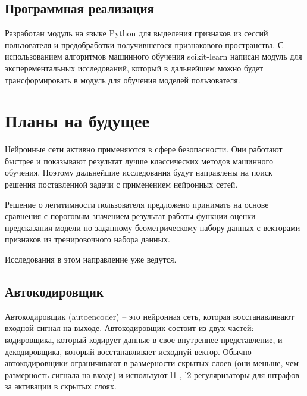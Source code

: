\documentclass[12pt]{article}
\begin{document}
    \subsection{Программная реализация}
    \label{sec:PracticalPart:SoftwareImplementation}

    Разработан модуль на языке Python для выделения признаков из сессий пользователя и предобработки получившегося признакового пространства. С использованием алгоритмов машинного обучения scikit-learn написан модуль для эксперементальных исследований, который в дальнейшем можно будет трансформировать в модуль для обучения моделей пользователя.


    \newpage



    \section{Планы на будущее}
    \label{sec:Future}

    \par Нейронные сети активно применяются в сфере безопасности. Они работают быстрее и показывают результат лучше классических методов машинного обучения. Поэтому дальнейшие исследования будут направлены на поиск решения поставленной задачи с применением нейронных сетей.

    \par Решение о легитимности пользователя предложено принимать на основе сравнения с пороговым значением результат работы функции оценки предсказания модели по заданному беометрическому набору данных с векторами признаков из тренировочного набора данных.

    \par Исследования в этом направление уже ведутся.


    \subsection{Автокодировщик}
    \label{sec:Future:Autoencoder}
    
    \par Автокодировщик (autoencoder) \cite{autoencoder} -- это нейронная сеть, которая восстанавливают входной сигнал на выходе. Автокодировщик состоит из двух частей: кодировщика, который кодирует данные в свое внутреннее представление, и декодировщика, который восстанавливает исходнуй вектор. Обычно автокодировщики ограничивают в размерности скрытых слоев (они меньше, чем размерность сигнала на входе) и используют l1-, l2-регуляризаторы для штрафов за активации в скрытых слоях.
\end{document}
